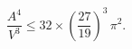 \begin{equation}
\frac{A^4}{V^3} \le 32 \times
\left(\frac{27}{19}\right)^3\,\pi^2.
\end{equation}

